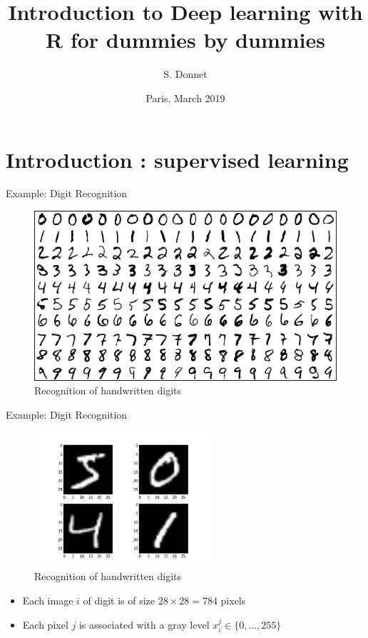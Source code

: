 \documentclass[ignorenonframetext,]{beamer}
\title{Introduction to Deep learning with R for dummies by dummies}
\author{S. Donnet}
\date{Paris, March 2019}
\providecommand{\tightlist}{%
  \setlength{\itemsep}{0pt}\setlength{\parskip}{0pt}}
\begin{document}
\frame{\titlepage}

\hypertarget{introduction-supervised-learning}{%
\section{Introduction : supervised
learning}\label{introduction-supervised-learning}}

\begin{frame}{Example: Digit Recognition}
\protect\hypertarget{example-digit-recognition}{}

\begin{figure}
\centering
\includegraphics{mnist.png}
\caption{Recognition of handwritten digits}
\end{figure}

\end{frame}

\begin{frame}{Example: Digit Recognition}
\protect\hypertarget{example-digit-recognition-1}{}

\begin{figure}
\centering
\includegraphics[width=2.60417in,height=\textheight]{mnist_details.png}
\caption{Recognition of handwritten digits}
\end{figure}

\begin{itemize}
\tightlist
\item
  Each image \(i\) of digit is of size \(28 \times 28 = 784\) pixels
\item
  Each pixel \(j\) is associated with a gray level
  \(x_i^j \in \{0, \dots, 255 \}\)
\end{itemize}

\end{frame}
\end{document}
